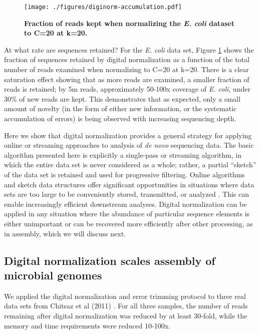 \begin{figure}[!ht]
\centerline{\texttt{[image: ./figures/diginorm-accumulation.pdf]}}
\caption{
{\bf Fraction of reads kept when normalizing the {\em E. coli} dataset to C=20 at k=20.}}
\label{fig:accumulate}
\end{figure}


At what rate are sequences retained?  For the {\em E. coli} data set, Figure
\ref{fig:accumulate} shows the fraction of sequences retained by digital
normalization as a function of the total number of reads examined when
normalizing to C=20 at k=20.  There is a clear saturation effect showing that
as more reads are examined, a smaller fraction of reads is retained; by 5m
reads, approximately 50-100x coverage of {\em E. coli}, under 30\% of new reads
are kept.  This demonstrates that as expected, only a small amount of novelty
(in the form of either new information, or the systematic accumulation of
errors) is being observed with increasing sequencing depth.

Here we show that digital normalization provides a general strategy for applying
online or streaming approaches to analysis of {\em de novo} sequencing
data.  The basic algorithm presented here is explicitly a single-pass or streaming
algorithm, in which the entire data set is never considered as a
whole; rather, a partial ``sketch'' of the data set is retained and
used for progressive filtering.  Online algorithms and sketch data
structures offer significant opportunities in situations where data
sets are too large to be conveniently stored, transmitted, or analyzed
\cite{muthukrishnan2005data}.  This can enable increasingly efficient
downstream analyses.
Digital normalization can be applied in any situation where the
abundance of particular sequence elements is either unimportant or can be
recovered more efficiently after other processing, as in assembly, which we will discuss
next.




\subsection{Digital normalization scales assembly of microbial genomes}

We applied the digital normalization and error trimming protocol to
three real data sets from Chitsaz et al (2011) \cite{pubmed21926975}. For all three samples, the number of reads
remaining after digital normalization was reduced by at least 30-fold, while
the memory and time requirements were reduced 10-100x.

